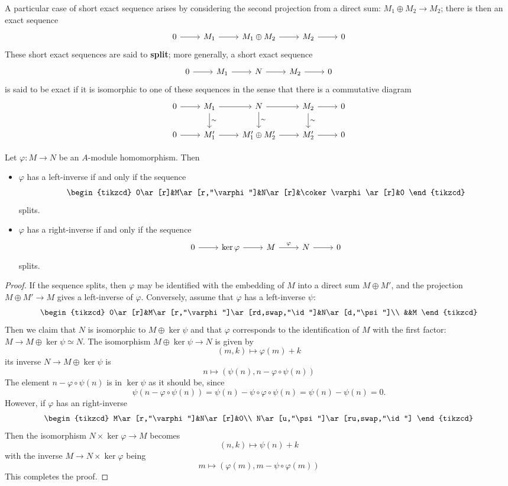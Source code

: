A particular case of short exact sequence arises by considering the second projection from a direct sum: $M_1\oplus M_2\to M_2$; there is then an exact sequence
\[\begin{tikzcd}
0\ar[r]&M_1\ar[r]&M_1\oplus M_2\ar[r]&M_2\ar[r]&0
\end{tikzcd}\]
These short exact sequences are said to \textbf{split}; more generally, a short exact sequence
\[\begin{tikzcd}
0\ar[r]&M_1\ar[r]&N\ar[r]&M_2\ar[r]&0
\end{tikzcd}\]
is said to be exact if it is isomorphic to one of these sequences in the sense that there is a commutative diagram
\[\begin{tikzcd}
0\ar[r]&M_1\ar[d,"\sim"]\ar[r]&N\ar[r]\ar[d,"\sim"]&M_2\ar[r]\ar[d,"\sim"]&0\\
0\ar[r]&M'_1\ar[r]&M'_1\oplus M'_2\ar[r]&M'_2\ar[r]&0
\end{tikzcd}\]
\begin{theorem}\label{split theo}
Let $\varphi:M\to N$ be an $A$-module homomorphism. Then
\begin{itemize}
\item $\varphi$ has a left-inverse if and only if the sequence
\[\begin{tikzcd}
0\ar[r]&M\ar[r,"\varphi"]&N\ar[r]&\coker\varphi\ar[r]&0
\end{tikzcd}\]
splits.
\item $\varphi$ has a right-inverse if and only if the sequence
\[\begin{tikzcd}
0\ar[r]&\ker\varphi\ar[r]&M\ar[r,"\varphi"]&N\ar[r]&0
\end{tikzcd}\]
splits.
\end{itemize}
\end{theorem}
\begin{proof}
If the sequence splits, then $\varphi$ may be identified with the embedding of $M$ into a direct sum $M\oplus M'$, and the projection $M\oplus M'\to M$ gives a left-inverse of $\varphi$. Conversely, assume that $\varphi$ has a left-inverse $\psi$:
\[\begin{tikzcd}
0\ar[r]&M\ar[r,"\varphi"]\ar[rd,swap,"\id"]&N\ar[d,"\psi"]\\
&&M
\end{tikzcd}\]
Then we claim that $N$ is isomorphic to $M\oplus\ker\psi$ and that $\varphi$ corresponds to the
identification of $M$ with the first factor: $M\to M\oplus\ker\psi\simeq N$. The isomorphism
$M\oplus\ker\psi\to N$ is given by
\[(m,k)\mapsto\varphi(m)+k\]
its inverse $N\to M\oplus\ker\psi$ is
\[n\mapsto(\psi(n),n-\varphi\circ\psi(n))\]
The element $n-\varphi\circ\psi(n)$ is in $\ker\psi$ as it should be, since
\[\psi(n-\varphi\circ\psi(n))=\psi(n)-\psi\circ\varphi\circ\psi(n)=\psi(n)-\psi(n)=0.\]
However, if $\varphi$ has an right-inverse
\[\begin{tikzcd}
M\ar[r,"\varphi"]&N\ar[r]&0\\
N\ar[u,"\psi"]\ar[ru,swap,"\id"]
\end{tikzcd}\]
Then the isomorphism $N\times\ker\varphi\to M$ becomes
\[(n,k)\mapsto\psi(n)+k\]
with the inverse $M\to N\times\ker\varphi$ being
\[m\mapsto(\varphi(m),m-\psi\circ\varphi(m))\]
This completes the proof.
\end{proof}
